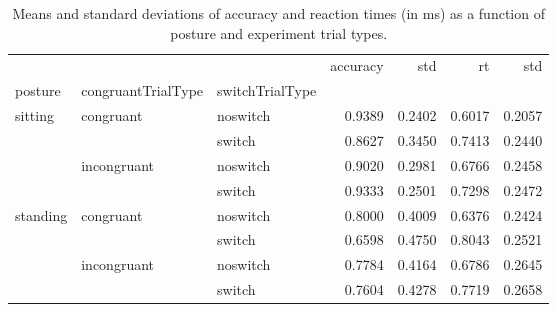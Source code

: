 \begin{table}
\centering
\caption{Means and standard deviations of accuracy and reaction times (in ms) as a function of posture and experiment trial types.}
\label{table-task-switching-replication-reaction-time}
\begin{tabular}{lllrrrr}
\toprule
         &             &        & accuracy &    std &     rt &    std \\
posture & congruantTrialType & switchTrialType &          &        &        &        \\
\midrule
sitting & congruant & noswitch &   0.9389 & 0.2402 & 0.6017 & 0.2057 \\
         &             & switch &   0.8627 & 0.3450 & 0.7413 & 0.2440 \\
         & incongruant & noswitch &   0.9020 & 0.2981 & 0.6766 & 0.2458 \\
         &             & switch &   0.9333 & 0.2501 & 0.7298 & 0.2472 \\
standing & congruant & noswitch &   0.8000 & 0.4009 & 0.6376 & 0.2424 \\
         &             & switch &   0.6598 & 0.4750 & 0.8043 & 0.2521 \\
         & incongruant & noswitch &   0.7784 & 0.4164 & 0.6786 & 0.2645 \\
         &             & switch &   0.7604 & 0.4278 & 0.7719 & 0.2658 \\
\bottomrule
\end{tabular}
\end{table}
